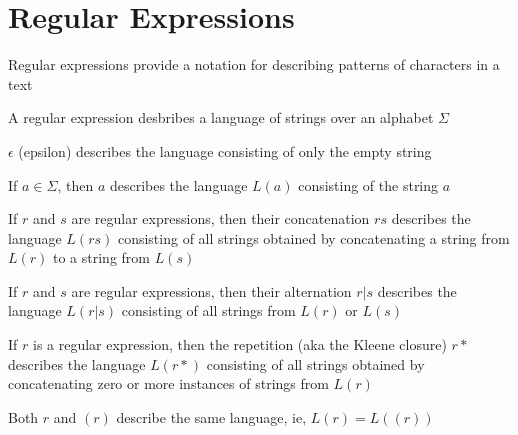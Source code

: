 \documentclass[8pt,a4paper,compress]{beamer}
\begin{document}
\section{Regular Expressions}
\begin{frame}[fragile]
\pause

Regular expressions provide a notation for describing patterns of characters in a text

\pause\bigskip

A regular expression desbribes a language of strings over an alphabet $\Sigma$

\pause\bigskip

$\epsilon$ (epsilon) describes the language consisting of only the empty string

\pause\bigskip
If $a \in \Sigma$, then $a$ describes the language $L(a)$ consisting of the string $a$

\pause\bigskip
If $r$ and $s$ are regular expressions, then their concatenation $rs$ describes the language $L(rs)$ consisting of all strings obtained by concatenating a string from $L(r)$ to a string from $L(s)$

\pause\bigskip
If $r$ and $s$ are regular expressions, then their alternation $r|s$ describes the language $L(r|s)$ consisting of all strings from $L(r)$ or $L(s)$

\pause\bigskip
If $r$ is a regular expression, then the repetition (aka the Kleene closure) $r*$ describes the language $L(r*)$ consisting of all strings obtained by concatenating zero or more instances of strings from $L(r)$

\pause\bigskip
Both $r$ and $(r)$ describe the same language, ie, $L(r) = L((r))$
\end{frame}
\end{document}
